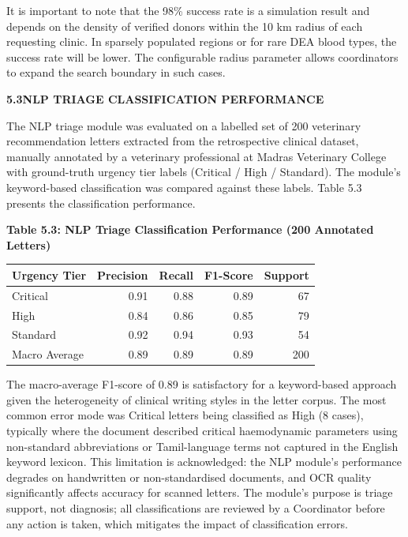 \documentclass[12pt,a4paper]{article}
\begin{document}
\noindent It is important to note that the 98\% success rate is a simulation result and depends on the density of verified donors within the 10 km radius of each requesting clinic. In sparsely populated regions or for rare DEA blood types, the success rate will be lower. The configurable radius parameter allows coordinators to expand the search boundary in such cases.

\vspace{2em}
\noindent\textbf{5.3\quad NLP TRIAGE CLASSIFICATION PERFORMANCE}
\vspace{0.8em}

\noindent The NLP triage module was evaluated on a labelled set of 200 veterinary recommendation letters extracted from the retrospective clinical dataset, manually annotated by a veterinary professional at Madras Veterinary College with ground-truth urgency tier labels (Critical / High / Standard). The module's keyword-based classification was compared against these labels. Table 5.3 presents the classification performance.

\begin{center}
\textbf{Table 5.3: NLP Triage Classification Performance (200 Annotated Letters)}
\vspace{0.4em}
\begin{tabular}{lrrrr}
\toprule
\textbf{Urgency Tier} & \textbf{Precision} & \textbf{Recall} & \textbf{F1-Score} & \textbf{Support} \\
\midrule
Critical & 0.91 & 0.88 & 0.89 & 67 \\
High & 0.84 & 0.86 & 0.85 & 79 \\
Standard & 0.92 & 0.94 & 0.93 & 54 \\
\midrule
Macro Average & 0.89 & 0.89 & 0.89 & 200 \\
\bottomrule
\end{tabular}
\end{center}

\noindent The macro-average F1-score of 0.89 is satisfactory for a keyword-based approach given the heterogeneity of clinical writing styles in the letter corpus. The most common error mode was Critical letters being classified as High (8 cases), typically where the document described critical haemodynamic parameters using non-standard abbreviations or Tamil-language terms not captured in the English keyword lexicon. This limitation is acknowledged: the NLP module's performance degrades on handwritten or non-standardised documents, and OCR quality significantly affects accuracy for scanned letters. The module's purpose is triage support, not diagnosis; all classifications are reviewed by a Coordinator before any action is taken, which mitigates the impact of classification errors.
\end{document}
